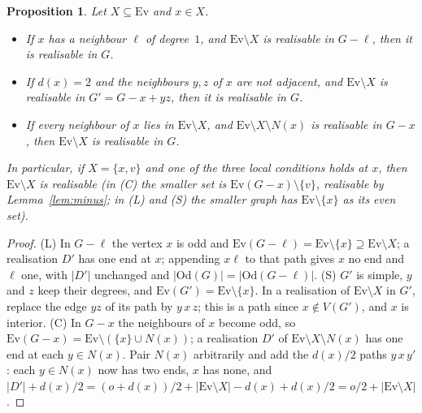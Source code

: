 \documentclass[11pt]{amsart}
\newtheorem{proposition}[theorem]{Proposition}
\theoremstyle{definition}
\newcommand{\Ev}{\mathrm{Ev}}
\newcommand{\Od}{\mathrm{Od}}
\begin{document}
\begin{proposition}\label{prop:moves}
Let $X\subseteq\Ev$ and $x\in X$.
\begin{itemize}
\item[(L)] If $x$ has a neighbour $\ell$ of degree~$1$, and $\Ev\setminus X$ is realisable in
$G-\ell$, then it is realisable in $G$.
\item[(S)] If $d(x)=2$ and the neighbours $y,z$ of $x$ are not adjacent, and $\Ev\setminus X$ is
realisable in $G'=G-x+yz$, then it is realisable in $G$.
\item[(C)] If every neighbour of $x$ lies in $\Ev\setminus X$, and $\Ev\setminus X\setminus N(x)$ is
realisable in $G-x$, then $\Ev\setminus X$ is realisable in $G$.
\end{itemize}
In particular, if $X=\{x,v\}$ and one of the three local conditions holds at $x$, then
$\Ev\setminus X$ is realisable (in (C) the smaller set is $\Ev(G-x)\setminus\{v\}$, realisable by
Lemma~\ref{lem:minus}; in (L) and (S) the smaller graph has $\Ev\setminus\{x\}$ as its even set).
\end{proposition}

\begin{proof}
(L) In $G-\ell$ the vertex $x$ is odd and $\Ev(G-\ell)=\Ev\setminus\{x\}\supseteq\Ev\setminus X$; a
realisation $D'$ has one end at $x$; appending $x\ell$ to that path gives $x$ no end and $\ell$ one,
with $|D'|$ unchanged and $|\Od(G)|=|\Od(G-\ell)|$. (S) $G'$ is simple, $y$ and $z$ keep their
degrees, and $\Ev(G')=\Ev\setminus\{x\}$. In a realisation of $\Ev\setminus X$ in $G'$, replace the
edge $yz$ of its path by $y\,x\,z$; this is a path since $x\notin V(G')$, and $x$ is interior. (C) In
$G-x$ the neighbours of $x$ become odd, so
$\Ev(G-x)=\Ev\setminus(\{x\}\cup N(x))$; a realisation $D'$ of $\Ev\setminus X\setminus N(x)$ has one
end at each $y\in N(x)$. Pair $N(x)$ arbitrarily and add the $d(x)/2$ paths $y\,x\,y'$: each
$y\in N(x)$ now has two ends, $x$ has none, and
$|D'|+d(x)/2=(o+d(x))/2+|\Ev\setminus X|-d(x)+d(x)/2=o/2+|\Ev\setminus X|$.
\end{proof}
\end{document}
